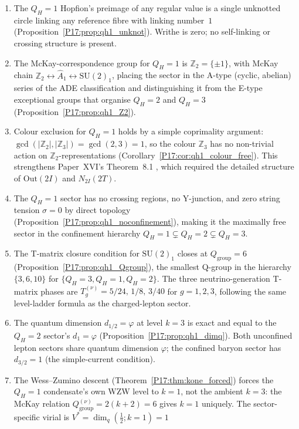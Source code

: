 \documentclass[11pt,a4paper]{article}
\theoremstyle{definition}\newtheorem{definition}[theorem]{Definition}
\theoremstyle{remark}
\newcommand{\vp}{\varphi}
\newcommand{\SU}{\mathrm{SU}}
\newcommand{\twoI}{2I}
\newcommand{\twoT}{2T}
\newcommand{\QH}{Q_H}
\newcommand{\Ztwo}{\mathbb{Z}_2}
\newcommand{\Zthree}{\mathbb{Z}_3}
\newcommand{\dimq}[1]{d_{#1}}
\begin{document}
\begin{enumerate}[noitemsep]
\item The $\QH=1$ Hopfion's preimage of any regular value is a single
  unknotted circle linking any reference fibre with linking number~$1$
  (Proposition~\ref{P17:prop:qh1_unknot}). Writhe is zero; no self-linking
  or crossing structure is present.
\item The McKay-correspondence group for $\QH=1$ is
  $\Ztwo=\{\pm1\}$, with McKay chain
  $\Ztwo\leftrightarrow\widehat{A}_1\leftrightarrow\SU(2)_1$, placing
  the sector in the A-type (cyclic, abelian) series of the ADE
  classification and distinguishing it from the E-type exceptional
  groups that organise $\QH=2$ and $\QH=3$
  (Proposition~\ref{P17:prop:qh1_Z2}).
\item Colour exclusion for $\QH=1$ holds by a simple coprimality
  argument: $\gcd(|\Ztwo|,|\Zthree|)=\gcd(2,3)=1$, so the colour
  $\Zthree$ has no non-trivial action on $\Ztwo$-representations
  (Corollary~\ref{P17:cor:qh1_colour_free}). This strengthens
  Paper~XVI's Theorem~8.1%
  , which required the detailed structure of $\mathrm{Out}(\twoI)$ and
  $N_{\twoI}(\twoT)$.
\item The $\QH=1$ sector has no crossing regions, no Y-junction, and
  zero string tension $\sigma=0$ by direct topology
  (Proposition~\ref{P17:prop:qh1_noconfinement}), making it the
  maximally free sector in the confinement hierarchy
  $\QH=1\subsetneq\QH=2\subsetneq\QH=3$.
\item The T-matrix closure condition for $\SU(2)_1$ closes at
  $Q_{\mathrm{group}}=6$ (Proposition~\ref{P17:prop:qh1_Qgroup}), the
  smallest Q-group in the hierarchy $\{3,6,10\}$ for
  $\{\QH=3,\QH=1,\QH=2\}$. The three neutrino-generation T-matrix
  phases are $T_g^{(\nu)}=5/24,\,1/8,\,3/40$ for $g=1,2,3$, following
  the same level-ladder formula as the charged-lepton sector.
\item The quantum dimension $\dimq{1/2}=\vp$ at level $k=3$ is exact
  and equal to the $\QH=2$ sector's $\dimq{1}=\vp$
  (Proposition~\ref{P17:prop:qh1_dimq}). Both unconfined lepton sectors
  share quantum dimension $\vp$; the confined baryon sector has
  $\dimq{3/2}=1$ (the simple-current condition).
\item The Wess--Zumino descent (Theorem~\ref{P17:thm:kone_forced}) forces
  the $\QH=1$ condensate's own WZW level to $k=1$, not the ambient
  $k=3$: the McKay relation $Q_{\mathrm{group}}^{(\nu)}=2(k+2)=6$ gives
  $k=1$ uniquely.  The sector-specific virial is $V^*=\dim_q(\tfrac12;k{=}1)=1$

\end{enumerate}
\end{document}

